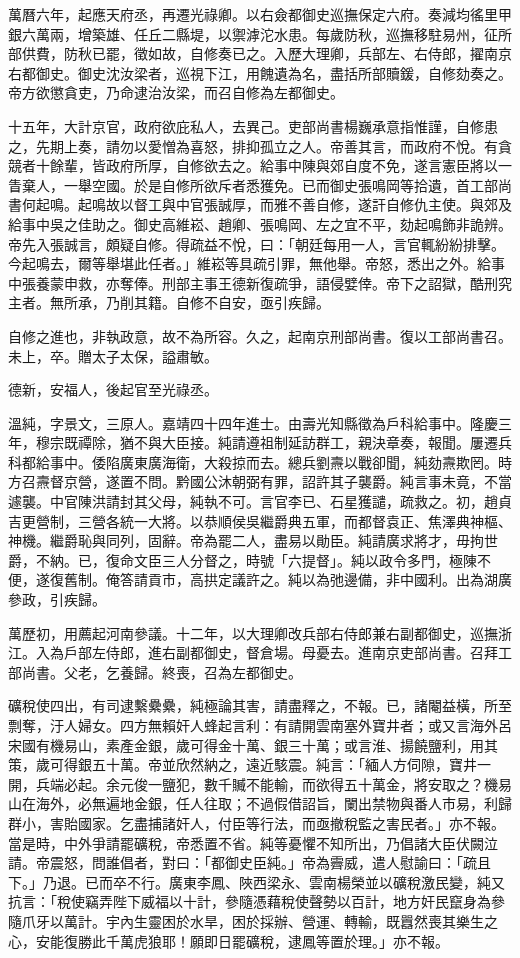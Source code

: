 \begin{pinyinscope}
萬曆六年，起應天府丞，再遷光祿卿。以右僉都御史巡撫保定六府。奏減均徭里甲銀六萬兩，增築雄、任丘二縣堤，以禦滹沱水患。每歲防秋，巡撫移駐易州，征所部供費，防秋已罷，徵如故，自修奏已之。入歷大理卿，兵部左、右侍郎，擢南京右都御史。御史沈汝梁者，巡視下江，用餽遺為名，盡括所部贖鍰，自修劾奏之。帝方欲懲貪吏，乃命逮治汝梁，而召自修為左都御史。

十五年，大計京官，政府欲庇私人，去異己。吏部尚書楊巍承意指惟謹，自修患之，先期上奏，請勿以愛憎為喜怒，排抑孤立之人。帝善其言，而政府不悅。有貪競者十餘輩，皆政府所厚，自修欲去之。給事中陳與郊自度不免，遂言憲臣將以一眚棄人，一舉空國。於是自修所欲斥者悉獲免。已而御史張鳴岡等拾遺，首工部尚書何起鳴。起鳴故以督工與中官張誠厚，而雅不善自修，遂訐自修仇主使。與郊及給事中吳之佳助之。御史高維崧、趙卿、張鳴岡、左之宜不平，劾起鳴飾非詭辨。帝先入張誠言，頗疑自修。得疏益不悅，曰：「朝廷每用一人，言官輒紛紛排擊。今起鳴去，爾等舉堪此任者。」維崧等具疏引罪，無他舉。帝怒，悉出之外。給事中張養蒙申救，亦奪俸。刑部主事王德新復疏爭，語侵嬖倖。帝下之詔獄，酷刑究主者。無所承，乃削其籍。自修不自安，亟引疾歸。

自修之進也，非執政意，故不為所容。久之，起南京刑部尚書。復以工部尚書召。未上，卒。贈太子太保，謚肅敏。

德新，安福人，後起官至光祿丞。

溫純，字景文，三原人。嘉靖四十四年進士。由壽光知縣徵為戶科給事中。隆慶三年，穆宗既禫除，猶不與大臣接。純請遵祖制延訪群工，親決章奏，報聞。屢遷兵科都給事中。倭陷廣東廣海衛，大殺掠而去。總兵劉燾以戰卻聞，純劾燾欺罔。時方召燾督京營，遂置不問。黔國公沐朝弼有罪，詔許其子襲爵。純言事未竟，不當遽襲。中官陳洪請封其父母，純執不可。言官李已、石星獲譴，疏救之。初，趙貞吉更營制，三營各統一大將。以恭順侯吳繼爵典五軍，而都督袁正、焦澤典神樞、神機。繼爵恥與同列，固辭。帝為罷二人，盡易以勛臣。純請廣求將才，毋拘世爵，不納。已，復命文臣三人分督之，時號「六提督」。純以政令多門，極陳不便，遂復舊制。俺答請貢市，高拱定議許之。純以為弛邊備，非中國利。出為湖廣參政，引疾歸。

萬歷初，用薦起河南參議。十二年，以大理卿改兵部右侍郎兼右副都御史，巡撫浙江。入為戶部左侍郎，進右副都御史，督倉場。母憂去。進南京吏部尚書。召拜工部尚書。父老，乞養歸。終喪，召為左都御史。

礦稅使四出，有司逮繫纍纍，純極論其害，請盡釋之，不報。已，諸閹益橫，所至剽奪，汙人婦女。四方無賴奸人蜂起言利：有請開雲南塞外寶井者；或又言海外呂宋國有機易山，素產金銀，歲可得金十萬、銀三十萬；或言淮、揚饒鹽利，用其策，歲可得銀五十萬。帝並欣然納之，遠近駭震。純言：「緬人方伺隙，寶井一開，兵端必起。余元俊一鹽犯，數千贓不能輸，而欲得五十萬金，將安取之？機易山在海外，必無遍地金銀，任人往取；不過假借詔旨，闌出禁物與番人市易，利歸群小，害貽國家。乞盡捕諸奸人，付臣等行法，而亟撤稅監之害民者。」亦不報。當是時，中外爭請罷礦稅，帝悉置不省。純等憂懼不知所出，乃倡諸大臣伏闕泣請。帝震怒，問誰倡者，對曰：「都御史臣純。」帝為霽威，遣人慰諭曰：「疏且下。」乃退。已而卒不行。廣東李鳳、陜西梁永、雲南楊榮並以礦稅激民變，純又抗言：「稅使竊弄陛下威福以十計，參隨憑藉稅使聲勢以百計，地方奸民竄身為參隨爪牙以萬計。宇內生靈困於水旱，困於採辦、營運、轉輸，既囂然喪其樂生之心，安能復勝此千萬虎狼耶！願即日罷礦稅，逮鳳等置於理。」亦不報。


\end{pinyinscope}
